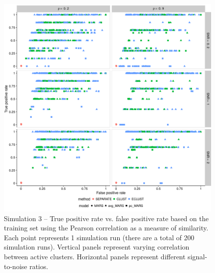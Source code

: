 \begin{figure}
	\includegraphics[scale=0.6, keepaspectratio]{./figs/hydra/results/figures/sim3-sept27/tpr_fpr_Correlation_sim3.png}
	\caption{Simulation 3 -- True positive rate vs. false positive rate based on the training set using the Pearson correlation as a measure of similarity. Each point represents 1 simulation run (there are a total of 200 simulation runs). Vertical panels represent varying correlation between active clusters. Horizontal panels represent different signal-to-noise ratios.}
	\label{fig:tpr_fpr_Correlation_sim3}
\end{figure}


